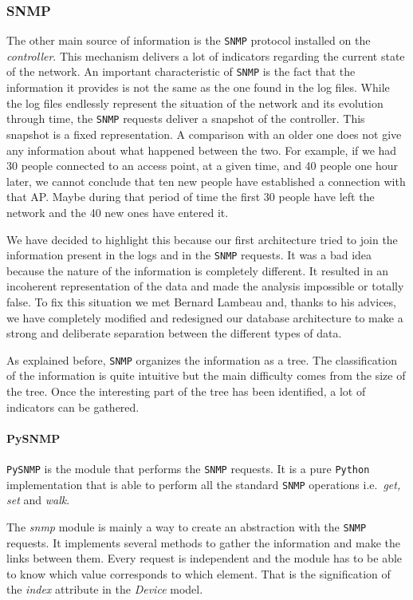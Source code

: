 \subsubsection{SNMP}
The other main source of information is the \texttt{SNMP} protocol installed on the \emph{controller}. This mechanism delivers a lot of indicators regarding the current state of the network. An important characteristic of \texttt{SNMP} is the fact that the information it provides is not the same as the one found in the log files. While the log files endlessly represent the situation of the network and its evolution through time, the \texttt{SNMP} requests deliver a snapshot of the controller. This snapshot is a fixed representation. A comparison with an older one does not give any information about what happened between the two. For example, if we had 30 people connected to an access point, at a given time, and 40 people one hour later, we cannot conclude that ten new people have established a connection with that AP. Maybe during that period of time the first 30 people have left the network and the 40 new ones have entered it. 

We have decided to highlight this because our first architecture tried to join the information present in the logs and in the \texttt{SNMP} requests. It was a bad idea because the nature of the information is completely different. It resulted in an incoherent representation of the data and made the analysis impossible or totally false. To fix this situation we met Bernard Lambeau and, thanks to his advices, we have completely modified and redesigned our database architecture to make a strong and deliberate separation between the different types of data.

As explained before, \texttt{SNMP} organizes the information as a tree. The classification of the information is quite intuitive but the main difficulty comes from the size of the tree. Once the interesting part of the tree has been identified, a lot of indicators can be gathered.

\paragraph{PySNMP} \texttt{PySNMP} is the  module that performs the \texttt{SNMP} requests. It is a pure \texttt{Python} implementation that is able to perform all the standard \texttt{SNMP} operations i.e.\  \emph{get, set} and \emph{walk}.

The \emph{snmp} module is mainly a way to create an abstraction with the \texttt{SNMP} requests. It implements several methods to gather the information and make the links between them. Every request is independent and the module has to be able to know which value corresponds to which element. That is the signification of the \emph{index} attribute in the \emph{Device} model.



